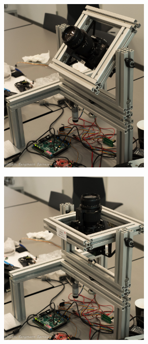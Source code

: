 \begin{figure}[!h]
    \centering
    \begin{subfigure}[b]{0.3\textwidth}
       \includegraphics[width=0.8\textwidth]{Billeder/Tilt45deg.jpg}
        \caption{}
        \label{fig:tilt_spejl1}
    \end{subfigure}
  \begin{subfigure}[b]{0.3\textwidth}
        \includegraphics[width=0.8\textwidth]{Billeder/Nulpunkt.jpg}

\end{subfigure}
\end{figure}
